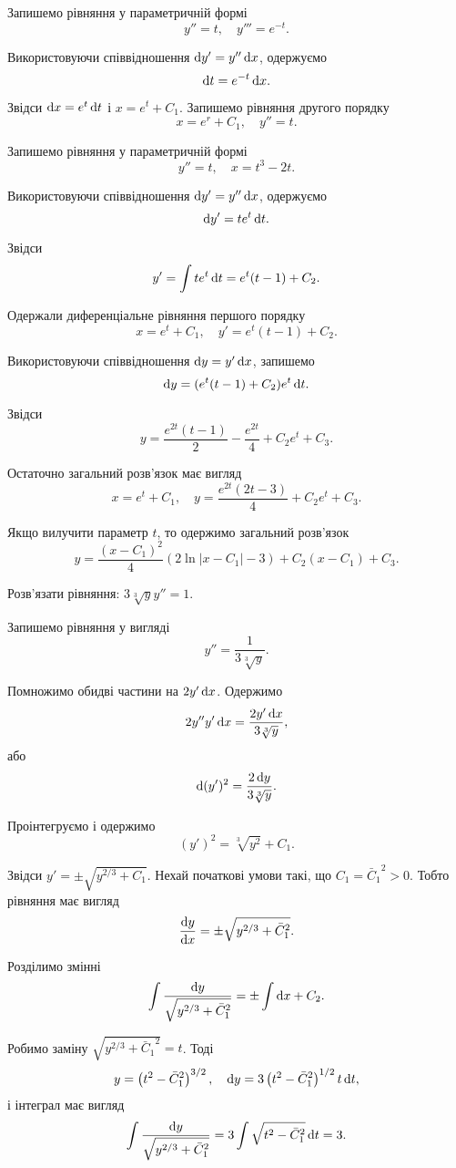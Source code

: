 \begin{solution}
	Запишемо рівняння у параметричній формі \[ y'' = t, \quad y''' = e^{-t}. \]
	
	Використовуючи співвідношення $\mathop{}\!\mathrm{d} y' = y'' \mathop{}\!\mathrm{d} x$, одержуємо \[ \mathop{}\!\mathrm{d} t = e^{-t} \mathop{}\!\mathrm{d} x. \] 
	
	Звідси $\mathop{}\!\mathrm{d} x = e^t \mathop{}\!\mathrm{d} t$ і $x = e^t + C_1$. Запишемо рівняння другого порядку \[ x = e^r + C_1, \quad y'' = t.\]
	
	Запишемо рівняння у параметричній формі \[ y'' = t, \quad x = t^3 - 2 t.\]
	
	Використовуючи співвідношення $\mathop{}\!\mathrm{d} y' = y'' \mathop{}\!\mathrm{d} x$, одержуємо \[ \mathop{}\!\mathrm{d} y' = t e^t \mathop{}\!\mathrm{d} t. \]
	
	Звідси \[y' = \int t e^t \mathop{}\!\mathrm{d} t = e^t (t - 1) + C_2.\]
	
	Одержали диференціальне рівняння першого порядку \[ x = e^t + C_1, \quad y' = e^t (t - 1) + C_2.\]
	
	Використовуючи співвідношення $\mathop{}\!\mathrm{d} y = y' \mathop{}\!\mathrm{d} x$, запишемо \[ \mathop{}\!\mathrm{d} y = (e^t (t - 1) + C_2) e^t \mathop{}\!\mathrm{d} t.\]
	
	Звідси \[ y = \frac{e^{2t}(t-1)}{2} - \frac{e^{2t}}{4} + C_2 e^t + C_3.\] 
	
	Остаточно загальний розв'язок має вигляд \[ x = e^t + C_1, \quad y = \frac{e^{2t}(2t - 3)}{4}+C_2e^t + C_3.\] 
	
	Якщо вилучити параметр $t$, то одержимо загальний розв'язок \[ y = \frac{(x-C_1)^2}{4}  \left( 2 \ln |x - C_1| - 3 \right) + C_2 (x - C_1) + C_3.\]
\end{solution}

\begin{example}
	Розв'язати рівняння: $3 \sqrt[3]{y} y'' = 1$.
\end{example}

\begin{solution}
	Запишемо рівняння у вигляді \[ y'' = \frac{1}{3\sqrt[3]{y}}. \]
	
	Помножимо обидві частини на $2 y' \mathop{}\!\mathrm{d} x$. Одержимо \[ 2 y'' y' \mathop{}\!\mathrm{d} x = \frac{2y'\mathop{}\!\mathrm{d} x}{3\sqrt[3]{y}}, \] або \[ \mathop{}\!\mathrm{d} (y')^2 = \frac{2\mathop{}\!\mathrm{d} y}{3\sqrt[3]{y}}. \]
	
	Проінтегруємо і одержимо \[ (y')^2 = \sqrt[3]{y^2} + C_1.\]
	
	Звідси $y' = \pm \sqrt{y^{2/3} + C_1}$. Нехай початкові умови такі, що $C_1 = {\bar C_1}^2 > 0$. Тобто рівняння має вигляд \[ \frac{\mathop{}\!\mathrm{d} y}{\mathop{}\!\mathrm{d} x} = \pm \sqrt{y^{2/3} + {\bar C_1}^2}. \]
	
	Розділимо змінні \[ \int \frac{\mathop{}\!\mathrm{d} y}{\sqrt{y^{2/3} + {\bar C_1}^2}} = \pm \int \mathop{}\!\mathrm{d} x + C_2. \]
	
	Робимо заміну $\sqrt{y^{2/3} + {\bar C_1}^2} = t$. Тоді \[ y = \left(t^2 - {\bar C_1}^2\right)^{3/2}, \quad \mathop{}\!\mathrm{d} y = 3 \left(t^2 - {\bar C_1}^2\right)^{1/2} t \mathop{}\!\mathrm{d} t,\] і інтеграл має вигляд \[ \int \frac{\mathop{}\!\mathrm{d} y}{\sqrt{y^{2/3} + {\bar C_1}^2}}=3\int \sqrt{t^2 - {\bar C_1}^2} \mathop{}\!\mathrm{d} t = 3.\]
\end{solution}

